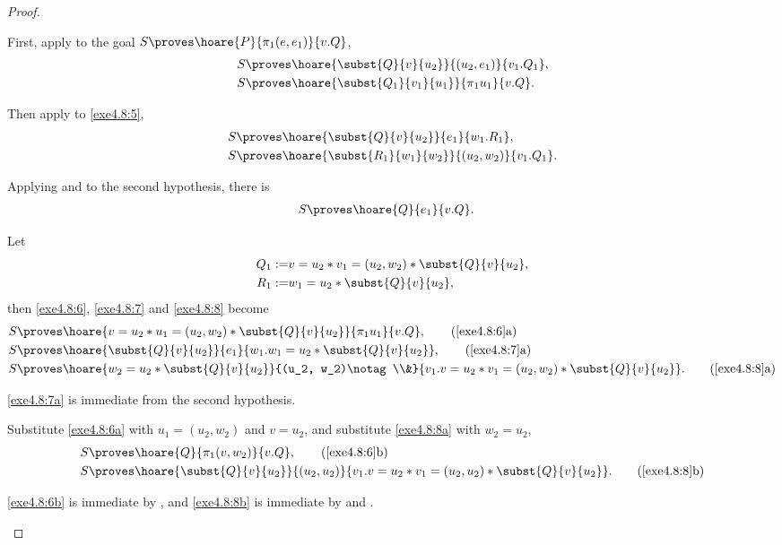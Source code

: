 \begin{proof}
\begin{enumerate}
  First, apply  to the goal $S \proves \hoare{P}
  {\pi_1(e, e_1)}{v.Q}$, 
  \begin{align}
    S \proves & \hoare{\subst{Q}{v}{u_2}}{(u_2, e_1)}{v_1.Q_1}, \label{exe4.8:5} \\
    S \proves & \hoare{\subst{Q_1}{v_1}{u_1}}{\pi_1 u_1}{v.Q}. \label{exe4.8:6}
  \end{align}
  
  Then apply  to \eqref{exe4.8:5},
  \begin{align}
    S \proves & \hoare{\subst{Q}{v}{u_2}}{e_1}{w_1.R_1}, \label{exe4.8:7} \\
    S \proves & \hoare{\subst{R_1}{w_1}{w_2}}{(u_2, w_2)}{v_1.Q_1}. \label{exe4.8:8}
  \end{align}

  Applying  and  to the
  second hypothesis, there is
  \begin{align*}
    S \proves & \hoare{Q}{e_1}{v.Q}.
  \end{align*}

  Let 
  \begin{align*}
    Q_1 := & v = u_2 * v_1 = (u_2, w_2) * \subst{Q}{v}{u_2}, \\
    R_1 := & w_1 = u_2 * \subst{Q}{v}{u_2},
  \end{align*}
  then \eqref{exe4.8:6}, \eqref{exe4.8:7} and \eqref{exe4.8:8} become
  \begin{align}
    S \proves & 
    \hoare{v = u_2 * u_1 = (u_2, w_2) * \subst{Q}{v}{u_2}}{\pi_1 u_1}{v.Q},
    \tag{\ref{exe4.8:6}a} \label{exe4.8:6a} \\
    S \proves & \hoare{\subst{Q}{v}{u_2}}{e_1}{w_1.w_1 = u_2 * \subst{Q}{v}{u_2}},
    \tag{\ref{exe4.8:7}a} \label{exe4.8:7a} \\
    S \proves & \hoare{w_2 = u_2 * \subst{Q}{v}{u_2}}{(u_2, w_2)\notag \\&}
    {v_1.v = u_2 * v_1 = (u_2, w_2) * \subst{Q}{v}{u_2}}.
    \tag{\ref{exe4.8:8}a} \label{exe4.8:8a}
  \end{align}
  
  \eqref{exe4.8:7a} is immediate from the second hypothesis.

  Substitute \eqref{exe4.8:6a} with $u_1 = (u_2, w_2)$ and $v = u_2$, and
  substitute \eqref{exe4.8:8a} with $w_2 = u_2$,
  \begin{align}
    S \proves & 
    \hoare{Q}{\pi_1 (v, w_2)}{v.Q}, \tag{\ref{exe4.8:6}b} \label{exe4.8:6b} \\
    S \proves & \hoare{\subst{Q}{v}{u_2}}{(u_2, u_2)}
    {v_1.v = u_2 * v_1 = (u_2, u_2) * \subst{Q}{v}{u_2}}.
    \tag{\ref{exe4.8:8}b} \label{exe4.8:8b}
  \end{align}

  \eqref{exe4.8:6b} is immediate by , and 
  \eqref{exe4.8:8b} is immediate by  and 
  .
  \end{enumerate}
\end{proof}

